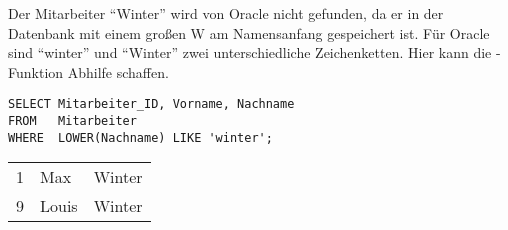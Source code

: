         \begin{center}
          \begin{small}
            \tablehead{}
            \begin{oraclesql}
              \begin{supertabular}{rll}

              \end{supertabular}
            \end{oraclesql}
          \end{small}
        \end{center}
        Der Mitarbeiter \enquote{Winter} wird von Oracle nicht gefunden, da er in der Datenbank mit einem gro\ss{}en W am Namensanfang gespeichert ist. F\"ur Oracle sind \enquote{winter} und \enquote{Winter} zwei unterschiedliche Zeichenketten. Hier kann die -Funktion Abhilfe schaffen.
        \begin{lstlisting}[language=oracle_sql,caption={LOWER - Die L\"osung des Problems},label=sql03_03]
SELECT Mitarbeiter_ID, Vorname, Nachname
FROM   Mitarbeiter
WHERE  LOWER(Nachname) LIKE 'winter';
        \end{lstlisting}
\clearpage
        \begin{center}
          \begin{small}
            \tablehead{}
            \begin{oraclesql}
              \begin{supertabular}{rll}
                1 & Max & Winter \\
                9 & Louis & Winter \\
              \end{supertabular}
            \end{oraclesql}
          \end{small}
        \end{center}
